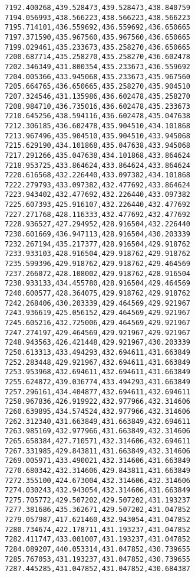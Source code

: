 \documentclass[11pt]{article}
\begin{document}
\begin{Verbatim}[commandchars=\\\{\}]
7192.400268,439.528473,439.528473,438.840759
7194.056993,438.566223,438.566223,438.566223
7195.714101,436.559692,436.559692,436.650665
7197.371590,435.967560,435.967560,436.650665
7199.029461,435.233673,435.258270,436.650665
7200.687714,435.258270,435.258270,436.602478
7202.346349,431.800354,435.233673,436.559692
7204.005366,433.945068,435.233673,435.967560
7205.664765,436.650665,435.258270,435.904510
7207.324546,431.135986,436.602478,435.258270
7208.984710,436.735016,436.602478,435.233673
7210.645256,438.594116,436.602478,435.047638
7212.306185,436.602478,435.904510,434.101868
7213.967496,435.904510,435.904510,433.945068
7215.629190,434.101868,435.047638,433.945068
7217.291266,435.047638,434.101868,433.864624
7218.953725,433.864624,433.864624,433.864624
7220.616568,432.226440,433.097382,434.101868
7222.279793,433.097382,432.477692,433.864624
7223.943402,432.477692,432.226440,433.097382
7225.607393,425.916107,432.226440,432.477692
7227.271768,428.116333,432.477692,432.477692
7228.936527,427.294952,428.916504,432.226440
7230.601669,436.947113,428.916504,430.203339
7232.267194,435.217377,428.916504,429.918762
7233.933103,428.916504,429.918762,429.918762
7235.599396,429.918762,429.918762,429.464569
7237.266072,428.108002,429.918762,428.916504
7238.933133,434.455780,428.916504,429.464569
7240.600577,428.364075,429.918762,429.918762
7242.268406,430.203339,429.464569,429.921967
7243.936619,425.056152,429.464569,429.921967
7245.605216,432.725006,429.464569,429.921967
7247.274197,429.464569,429.921967,429.921967
7248.943563,426.421448,429.921967,430.203339
7250.613313,433.494293,432.694611,431.663849
7252.283448,429.921967,432.694611,431.663849
7253.953968,432.694611,432.694611,431.663849
7255.624872,439.036774,433.494293,431.663849
7257.296161,434.404877,432.694611,432.694611
7258.967836,426.919922,432.977966,432.314606
7260.639895,434.574524,432.977966,432.314606
7262.312340,431.663849,431.663849,432.694611
7263.985169,432.977966,431.663849,432.314606
7265.658384,427.710571,432.314606,432.694611
7267.331985,429.843811,431.663849,432.314606
7269.005971,433.490021,432.314606,431.663849
7270.680342,432.314606,429.843811,431.663849
7272.355100,424.673004,432.314606,432.314606
7274.030243,432.943054,432.314606,431.663849
7275.705772,429.507202,429.507202,431.193237
7277.381686,435.362671,429.507202,431.047852
7279.057987,417.621460,432.943054,431.047852
7280.734674,422.178711,431.193237,431.047852
7282.411747,433.001007,431.193237,431.047852
7284.089207,440.053314,431.047852,430.739655
7285.767053,431.193237,431.047852,430.739655
7287.445285,431.047852,431.047852,430.684387

\end{Verbatim}
\end{document}
